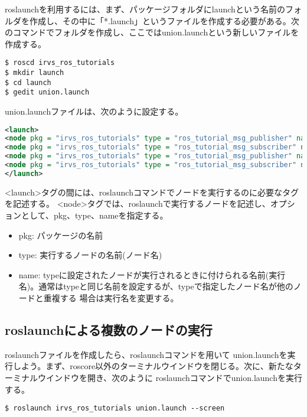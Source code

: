  roslaunchを利用するには、まず、パッケージフォルダにlaunchという名前のフォルダを作成し、その中に「*.launch」というファイルを作成する必要がある。次のコマンドでフォルダを作成し、ここではunion.launchという新しいファイルを作成する。

\begin{lstlisting}[language=ROS]
$ roscd irvs_ros_tutorials
$ mkdir launch
$ cd launch
$ gedit union.launch
\end{lstlisting}

union.launchファイルは、次のように設定する。

\begin{lstlisting}[language=XML]
<launch>
<node pkg = "irvs_ros_tutorials" type = "ros_tutorial_msg_publisher" name = "msg_publisher1" />
<node pkg = "irvs_ros_tutorials" type = "ros_tutorial_msg_subscriber" name = "msg_subscriber1" />
<node pkg = "irvs_ros_tutorials" type = "ros_tutorial_msg_publisher" name = "msg_publisher2" />
<node pkg = "irvs_ros_tutorials" type = "ros_tutorial_msg_subscriber" name = "msg_subscriber2" />
</launch>
\end{lstlisting}

<launch>タグの間には、roslaunchコマンドでノードを実行するのに必要なタグを記述する。 <node>タグでは、roslaunchで実行するノードを記述し、オプションとして、pkg、type、nameを指定する。

\begin{itemize}
\item  pkg: パッケージの名前
\item type: 実行するノードの名前(ノード名)
\item name:  typeに設定されたノードが実行されるときに付けられる名前(実行名)。通常はtypeと同じ名前を設定するが、typeで指定したノード名が他のノードと重複する  場合は実行名を変更する。
\end{itemize}

\subsection{roslaunchによる複数のノードの実行}

roslaunchファイルを作成したら、roslaunchコマンドを用いて  union.launchを実行しよう。まず、roscore以外のターミナルウインドウを閉じる。次に、新たなターミナルウインドウを開き、次のように  roslaunchコマンドでunion.launchを実行する。

\begin{lstlisting}[language=ROS]
$ roslaunch irvs_ros_tutorials union.launch --screen
\end{lstlisting}

